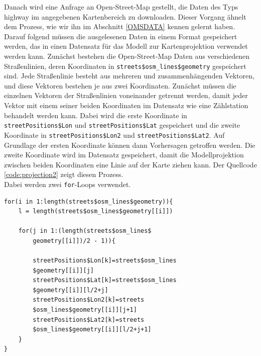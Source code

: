 \documentclass[a4paper,12pt]{thesis}
\begin{document}
Danach wird eine Anfrage an Open-Street-Map gestellt, die Daten des Typs \glqq{}highway\grqq{} im angegebenen Kartenbereich zu downloaden. Dieser Vorgang ähnelt dem Prozess, wie wir ihn im Abschnitt \ref{OMSDATA} kennen gelernt haben.\\
Darauf folgend müssen die ausgelesenen Daten in einem Format gespeichert werden, das in einen Datensatz für das Modell zur Kartenprojektion verwendet werden kann. Zunächst bestehen die Open-Street-Map Daten aus verschiedenen Straßenlinien, deren Koordinaten in \lstinline|streets$osm_lines$geometry| gespeichert sind. Jede Straßenlinie besteht aus mehreren und zusammenhängenden Vektoren, und diese Vektoren bestehen je aus zwei Koordinaten. Zunächst müssen die einzelnen Vektoren der Straßenlinien voneinander getrennt werden, damit jeder Vektor mit einem seiner beiden Koordinaten im Datensatz wie eine Zählstation behandelt werden kann. Dabei wird die erste Koordinate in \lstinline|streetPositions$Lon| und \lstinline|streetPositions$Lat| gespeichert und die zweite Koordinate in \lstinline|streetPositions$Lon2| und \lstinline|streetPositions$Lat2|. Auf Grundlage der ersten Koordinate können dann Vorhersagen getroffen werden. Die zweite Koordinate wird im Datensatz gespeichert, damit die Modellprojektion zwischen beiden Koordinaten eine Linie auf der Karte ziehen kann. Der Quellcode \ref{code:projection2} zeigt diesen Prozess.\\
Dabei werden zwei \lstinline|for|-Loops verwendet.

\begin{minipage}{\linewidth}
\begin{lstlisting}[caption={Speicherung der Koordinaten der Straßen},label=code:projection2]
for(i in 1:length(streets$osm_lines$geometry)){
	l = length(streets$osm_lines$geometry[[i]])
	
	for(j in 1:(length(streets$osm_lines$
		geometry[[i]])/2 - 1)){
	
		streetPositions$Lon[k]=streets$osm_lines
		$geometry[[i]][j]
		streetPositions$Lat[k]=streets$osm_lines
		$geometry[[i]][l/2+j]
		streetPositions$Lon2[k]=streets
		$osm_lines$geometry[[i]][j+1]
		streetPositions$Lat2[k]=streets
		$osm_lines$geometry[[i]][l/2+j+1]
	}
}
	
\end{lstlisting}
\end{minipage}
\end{document}
